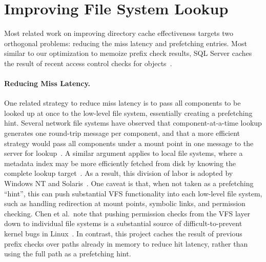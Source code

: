 \section{Improving File System Lookup }

Most related work on improving directory cache effectiveness targets
two orthogonal problems: reducing the miss latency and prefetching entries.
Most similar to our optimization to memoize 
prefix check results, SQL Server  caches the result of recent access control checks 
for objects~\citep{sql-memoize}.



\paragraph{Reducing Miss Latency.}
One related strategy to reduce miss latency is to pass all components to be looked up 
at once to the low-level file system, essentially creating a prefetching hint.
Several network file systems have observed that component-at-a-time lookup 
generates one round-trip message per component, and that a more efficient strategy
would pass all components under a mount point in one message to the server for lookup~\citep{duchamp94nfs,welch94comparison}.
A similar argument applies to local file systems, where a metadata index may be more efficiently fetched from disk
by knowing the complete lookup target~\citep{windowsinternals, lensing13dlfs}.
As a result, this division of labor is adopted by Windows NT and Solaris~\citep{windowsinternals,solarisinternals}.
One caveat is that, when not taken as a prefetching ``hint'', 
this can push substantial VFS functionality into each low-level file system, such as handling redirection at mount points, symbolic links,
and permission checking.
Chen et al.\ note that 
pushing permission checks from the VFS layer down to individual file systems 
is a substantial source of difficult-to-prevent kernel bugs in Linux~\citep{chen11kbugs}.
In contrast, this project caches the result of previous prefix checks over paths already in memory to reduce hit latency,
rather than using the full path as a prefetching hint.


